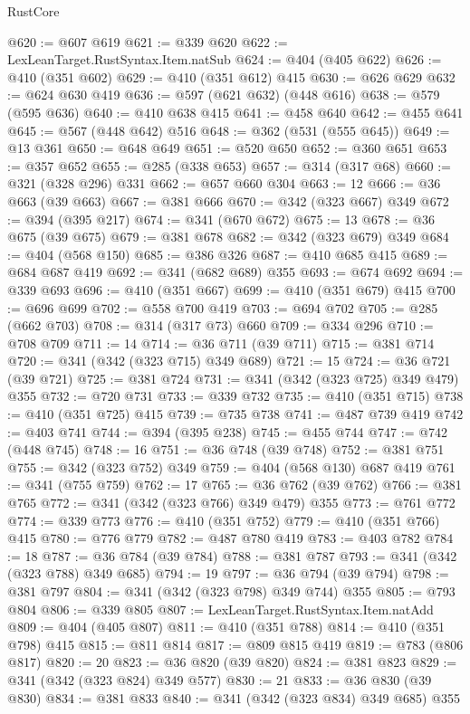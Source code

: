\begin{lexlean}{RustCore}
\begin{coremodule}
@620 := @607 @619
@621 := @339 @620
@622 := LexLeanTarget.RustSyntax.Item.natSub
@624 := @404 (@405 @622)
@626 := @410 (@351 @602)
@629 := @410 (@351 @612) @415
@630 := @626 @629
@632 := @624 @630 @419
@636 := @597 (@621 @632) (@448 @616)
@638 := @579 (@595 @636)
@640 := @410 @638 @415
@641 := @458 @640
@642 := @455 @641
@645 := @567 (@448 @642) @516
@648 := @362 (@531 (@555 @645))
@649 := @13 @361
@650 := @648 @649
@651 := @520 @650
@652 := @360 @651
@653 := @357 @652
@655 := @285 (@338 @653)
@657 := @314 (@317 @68)
@660 := @321 (@328 @296) @331
@662 := @657 @660 @304
@663 := 12
@666 := @36 @663 (@39 @663)
@667 := @381 @666
@670 := @342 (@323 @667) @349
@672 := @394 (@395 @217)
@674 := @341 (@670 @672)
@675 := 13
@678 := @36 @675 (@39 @675)
@679 := @381 @678
@682 := @342 (@323 @679) @349
@684 := @404 (@568 @150)
@685 := @386 @326
@687 := @410 @685 @415
@689 := @684 @687 @419
@692 := @341 (@682 @689) @355
@693 := @674 @692
@694 := @339 @693
@696 := @410 (@351 @667)
@699 := @410 (@351 @679) @415
@700 := @696 @699
@702 := @558 @700 @419
@703 := @694 @702
@705 := @285 (@662 @703)
@708 := @314 (@317 @73) @660
@709 := @334 @296
@710 := @708 @709
@711 := 14
@714 := @36 @711 (@39 @711)
@715 := @381 @714
@720 := @341 (@342 (@323 @715) @349 @689)
@721 := 15
@724 := @36 @721 (@39 @721)
@725 := @381 @724
@731 := @341 (@342 (@323 @725) @349 @479) @355
@732 := @720 @731
@733 := @339 @732
@735 := @410 (@351 @715)
@738 := @410 (@351 @725) @415
@739 := @735 @738
@741 := @487 @739 @419
@742 := @403 @741
@744 := @394 (@395 @238)
@745 := @455 @744
@747 := @742 (@448 @745)
@748 := 16
@751 := @36 @748 (@39 @748)
@752 := @381 @751
@755 := @342 (@323 @752) @349
@759 := @404 (@568 @130) @687 @419
@761 := @341 (@755 @759)
@762 := 17
@765 := @36 @762 (@39 @762)
@766 := @381 @765
@772 := @341 (@342 (@323 @766) @349 @479) @355
@773 := @761 @772
@774 := @339 @773
@776 := @410 (@351 @752)
@779 := @410 (@351 @766) @415
@780 := @776 @779
@782 := @487 @780 @419
@783 := @403 @782
@784 := 18
@787 := @36 @784 (@39 @784)
@788 := @381 @787
@793 := @341 (@342 (@323 @788) @349 @685)
@794 := 19
@797 := @36 @794 (@39 @794)
@798 := @381 @797
@804 := @341 (@342 (@323 @798) @349 @744) @355
@805 := @793 @804
@806 := @339 @805
@807 := LexLeanTarget.RustSyntax.Item.natAdd
@809 := @404 (@405 @807)
@811 := @410 (@351 @788)
@814 := @410 (@351 @798) @415
@815 := @811 @814
@817 := @809 @815 @419
@819 := @783 (@806 @817)
@820 := 20
@823 := @36 @820 (@39 @820)
@824 := @381 @823
@829 := @341 (@342 (@323 @824) @349 @577)
@830 := 21
@833 := @36 @830 (@39 @830)
@834 := @381 @833
@840 := @341 (@342 (@323 @834) @349 @685) @355

\end{coremodule}
\end{lexlean}
